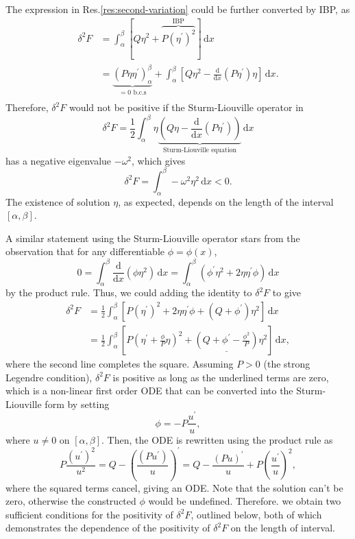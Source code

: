 \documentclass{article}
\theoremstyle{nonumberplain}
\begin{document}
The expression in Res.\ref{res:second-variation} could be further converted by IBP, as 
\[
    \begin{aligned}
        \delta ^2 F 
        &= \int_{\alpha }^{\beta }  \left[ Q \eta ^2 + \overbrace{P (\eta ^\prime )^{2}}^{\text{IBP}} \right] \,\mathrm{d}x  \\
        &= \underbrace{\left( P \eta  \eta ^\prime \right)_\alpha ^\beta }_{=0 \text{ b.c.s}}
            + \int_{\alpha }^{\beta } \left[ 
            Q \eta ^2 
            - \frac{\mathrm{d}}{\mathrm{d}x} \left(P \eta ^\prime \right) \eta 
        \right] \,\mathrm{d}x. \\ 
    \end{aligned}
\]
Therefore, $\delta ^ 2 F$ would not be positive if the Sturm-Liouville operator in 
\[
    \delta ^2 F = \frac{1}{2}\int_{\alpha }^{\beta } \eta \underbrace{\left(
        Q \eta  - \frac{\mathrm{d}}{\mathrm{d}x}  \left( P \eta ^\prime \right)
    \right)}_{\text{Sturm-Liouville equation}} \,\mathrm{d}x 
\]
has a negative eigenvalue $- \omega ^{2} $, which gives 
\[
    \delta ^2 F = \int_{\alpha }^{\beta } - \omega ^{2}  \eta ^{2}  \,\mathrm{d}x <0.
\]
The existence of solution $\eta $, as expected, depends on the length of the interval $[\alpha ,\beta ]$. 

A similar statement using the Sturm-Liouville operator stars from the observation that for any differentiable $\phi = \phi (x)$,
\[
    0 = \int_{\alpha }^{\beta } \frac{\mathrm{d}}{\mathrm{d}x} \left(\phi \eta ^{2} \right) \,\mathrm{d}x 
    = \int_{\alpha }^{\beta } \left(\phi ^\prime  \eta ^{2}  + 2 \eta  \eta ^\prime \phi \right) \,\mathrm{d}x  
\]
by the product rule. Thus, we could adding the identity to $\delta ^2 F$ to give 
\[
    \begin{aligned}
    \delta ^{2}  F 
    &=  \frac{1}{2} \int_{\alpha }^{\beta } \left[ 
        P (\eta ^\prime )^{2} + 2 \eta  \eta ^\prime  \phi + (Q + \phi ^\prime ) \eta ^{2} 
    \right] \,\mathrm{d}x  \\
    &= \frac{1}{2} \int_{\alpha }^{\beta } \left[
        P (\eta ^\prime  + \frac{\phi}{P} \eta )^2 + \underline{\left(Q + \phi ^\prime  - \frac{\phi ^{2} }{P}\right)} \eta ^2
    \right] \,\mathrm{d}x,
    \end{aligned}  
\]
where the second line completes the square. Assuming $P>0$ (the strong Legendre condition), $\delta ^{2} F$ is positive as long as the underlined terms are zero, which is a non-linear first order ODE that can be converted into the Sturm-Liouville form by setting 
\[
    \phi  = - P \frac{u^\prime }{u},
\]
where $u \neq 0$ on $[\alpha ,\beta ]$. Then, the ODE is rewritten using the product rule as 
\[
    P \frac{(u^\prime )^{2} }{u^{2} } 
    = Q - \left(\frac{(P u^\prime )}{u}\right)^\prime 
    = Q - \frac{(P u)^\prime }{u}+ P \left(\frac{u^\prime}{u}\right)^{2}, 
\]
where the squared terms cancel, giving an ODE. Note that the solution can't be zero, otherwise the constructed $\phi $ would be undefined. Therefore. we obtain two sufficient conditions for the positivity of $\delta ^{2} F$, outlined below, both of which demonstrates the dependence of the positivity of $\delta ^{2} F $ on the length of interval. 
\end{document}
